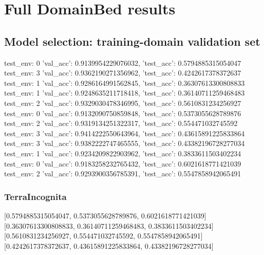 \documentclass{article}
\begin{document}
\section{Full DomainBed results}

\subsection{Model selection: training-domain validation set}
test_env: 0
{'val_acc': 0.9139954229076032, 'test_acc': 0.5794885315054047}
test_env: 3
{'val_acc': 0.9362190271356962, 'test_acc': 0.4242617378372637}
test_env: 1
{'val_acc': 0.9286164991562845, 'test_acc': 0.36307613300808833}
test_env: 1
{'val_acc': 0.9248635211718418, 'test_acc': 0.36140711259468483}
test_env: 2
{'val_acc': 0.9329030478346995, 'test_acc': 0.5610831234256927}
test_env: 0
{'val_acc': 0.9132090750859848, 'test_acc': 0.5373055628789876}
test_env: 2
{'val_acc': 0.9319134251322317, 'test_acc': 0.554471032745592}
test_env: 3
{'val_acc': 0.9414222550643964, 'test_acc': 0.43615891225833864}
test_env: 3
{'val_acc': 0.9382222747465555, 'test_acc': 0.43382196728277034}
test_env: 1
{'val_acc': 0.9234209822903962, 'test_acc': 0.3833611503402234}
test_env: 0
{'val_acc': 0.9183258232765432, 'test_acc': 0.6021618771421039}
test_env: 2
{'val_acc': 0.9293900356785391, 'test_acc': 0.5547858942065491}

\subsubsection{TerraIncognita}
[0.5794885315054047, 0.5373055628789876, 0.6021618771421039]
[0.36307613300808833, 0.36140711259468483, 0.3833611503402234]
[0.5610831234256927, 0.554471032745592, 0.5547858942065491]
[0.4242617378372637, 0.43615891225833864, 0.43382196728277034]

\begin{center}
\end{center}
\end{document}

